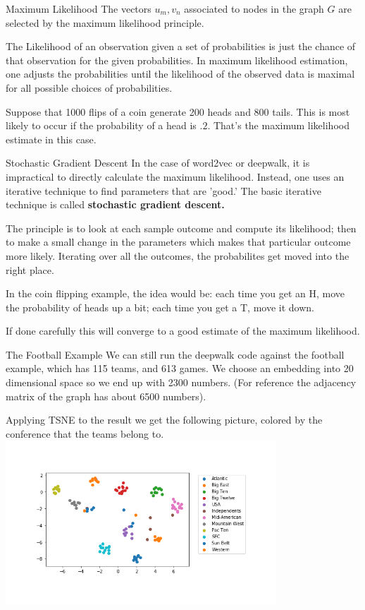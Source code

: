 \documentclass{beamer}
\begin{document}
  \begin{frame}{Maximum Likelihood}
    The vectors $u_m,v_n$ associated to nodes in the graph $G$ are selected by the maximum likelihood principle.

    \bigskip\noindent
    The Likelihood of an observation given a set of probabilities is just the chance of that observation for the given probabilities. In maximum likelihood estimation, one adjusts the probabilities until the likelihood of the observed data is maximal for all possible choices of probabilities.

    \bigskip\noindent
    Suppose that  1000 flips of a coin generate 200 heads and 800 tails.  This is most likely to occur if the probability of a head is $.2$.  That's the maximum likelihood estimate in this case.
  \end{frame}
  \begin{frame}{Stochastic Gradient Descent}
    In the case of word2vec or deepwalk, it is impractical to  directly calculate the maximum likelihood. Instead, one uses an iterative technique to find parameters that are 'good.'  The basic iterative technique is called \textbf{stochastic gradient descent.}

    \bigskip\noindent
    The principle is to look at each sample outcome and compute its likelihood; then to make a small change in the parameters which makes that particular outcome more likely.  Iterating over all the outcomes, the probabilites get moved into the right place.

    \bigskip\noindent
    In the coin flipping example, the idea would be: each time you get an H, move the probability of heads up a bit; each time you get a T, move it down.

    \bigskip\noindent
    If done carefully this will converge to a good estimate of the maximum likelihood.
  \end{frame}
  \begin{frame}{The Football Example}
    We can still run the deepwalk code against the football example, which has 115 teams, and 613 games.  We choose
    an embedding into 20 dimensional space so we end up with 2300 numbers.
    (For reference the adjacency matrix of the graph has about 6500 numbers).

    Applying TSNE to the result we get the following picture, colored by the conference that the teams belong to.
    \includegraphics[width=4in]{football_clusters.png}

 \end{frame}
  
    
    
    
\end{document}
